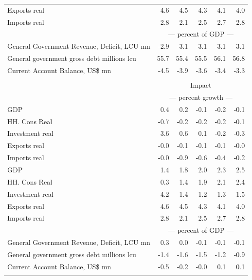 \documentclass{article}
\begin{document}
\begin{table}[ht]
\begin{tabular}{lrrrrr}
Exports real & 4.6 & 4.5 & 4.3 & 4.1 & 4.0 \\
Imports real & 2.8 & 2.1 & 2.5 & 2.7 & 2.8 \\
&\multicolumn{5}{c}{--- percent of GDP ---}           \\
General Government Revenue, Deficit, LCU mn & -2.9 & -3.1 & -3.1 & -3.1 & -3.1 \\
General government gross debt millions lcu & 55.7 & 55.4 & 55.5 & 56.1 & 56.8 \\
Current Account Balance, US\$ mn & -4.5 & -3.9 & -3.6 & -3.4 & -3.3 \\
&\multicolumn{5}{c}{  }           \\
&\multicolumn{5}{c}{Impact}           \\
&\multicolumn{5}{c}{--- percent growth ---}           \\
GDP & 0.4 & 0.2 & -0.1 & -0.2 & -0.1 \\
HH. Cons Real & -0.7 & -0.2 & -0.2 & -0.2 & -0.1 \\
Investment real & 3.6 & 0.6 & 0.1 & -0.2 & -0.3 \\
Exports real & -0.0 & -0.1 & -0.1 & -0.1 & -0.0 \\
Imports real & -0.0 & -0.9 & -0.6 & -0.4 & -0.2 \\
GDP & 1.4 & 1.8 & 2.0 & 2.3 & 2.5 \\
HH. Cons Real & 0.3 & 1.4 & 1.9 & 2.1 & 2.4 \\
Investment real & 4.2 & 1.4 & 1.2 & 1.3 & 1.5 \\
Exports real & 4.6 & 4.5 & 4.3 & 4.1 & 4.0 \\
Imports real & 2.8 & 2.1 & 2.5 & 2.7 & 2.8 \\
&\multicolumn{5}{c}{--- percent of GDP ---}           \\
General Government Revenue, Deficit, LCU mn & 0.3 & 0.0 & -0.1 & -0.1 & -0.1 \\
General government gross debt millions lcu & -1.4 & -1.6 & -1.5 & -1.2 & -0.9 \\
Current Account Balance, US\$ mn & -0.5 & -0.2 & -0.0 & 0.1 & 0.1 \\
&\multicolumn{5}{c}{  }           \\
\bottomrule
\end{tabular}
\end{table}
\end{document}
